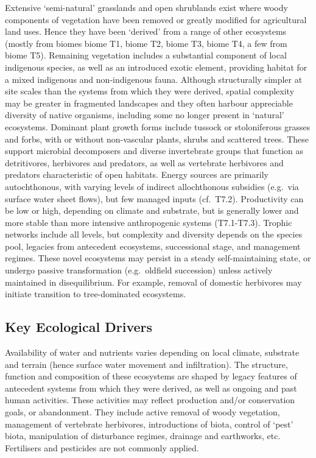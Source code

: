 \documentclass[
  letterpaper,
  DIV=11,
  numbers=noendperiod]{scrartcl}
\begin{document}
Extensive `semi-natural' grasslands and open shrublands exist where
woody components of vegetation have been removed or greatly modified for
agricultural land uses. Hence they have been `derived' from a range of
other ecosystems (mostly from biomes biome T1, biome T2, biome T3, biome
T4, a few from biome T5). Remaining vegetation includes a substantial
component of local indigenous species, as well as an introduced exotic
element, providing habitat for a mixed indigenous and non-indigenous
fauna. Although structurally simpler at site scales than the systems
from which they were derived, spatial complexity may be greater in
fragmented landscapes and they often harbour appreciable diversity of
native organisms, including some no longer present in `natural'
ecosystems. Dominant plant growth forms include tussock or stoloniferous
grasses and forbs, with or without non-vascular plants, shrubs and
scattered trees. These support microbial decomposers and diverse
invertebrate groups that function as detritivores, herbivores and
predators, as well as vertebrate herbivores and predators characteristic
of open habitats. Energy sources are primarily autochthonous, with
varying levels of indirect allochthonous subsidies (e.g.~via surface
water sheet flows), but few managed inputs (cf.~T7.2). Productivity can
be low or high, depending on climate and substrate, but is generally
lower and more stable than more intensive anthropogenic systems
(T7.1-T7.3). Trophic networks include all levels, but complexity and
diversity depends on the species pool, legacies from antecedent
ecosystems, successional stage, and management regimes. These novel
ecosystems may persist in a steady self-maintaining state, or undergo
passive transformation (e.g.~oldfield succession) unless actively
maintained in disequilibrium. For example, removal of domestic
herbivores may initiate transition to tree-dominated ecosystems.

\subsection{Key Ecological Drivers}\label{key-ecological-drivers-102}

Availability of water and nutrients varies depending on local climate,
substrate and terrain (hence surface water movement and infiltration).
The structure, function and composition of these ecosystems are shaped
by legacy features of antecedent systems from which they were derived,
as well as ongoing and past human activities. These activities may
reflect production and/or conservation goals, or abandonment. They
include active removal of woody vegetation, management of vertebrate
herbivores, introductions of biota, control of `pest' biota,
manipulation of disturbance regimes, drainage and earthworks, etc.
Fertilisers and pesticides are not commonly applied.
\end{document}
